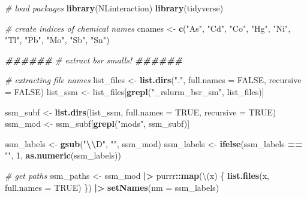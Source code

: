 \documentclass[12pt, twoside]{amherstthesis}
\newenvironment{Shaded}{\begin{snugshade}}{\end{snugshade}}
\newcommand{\AttributeTok}[1]{\textcolor[rgb]{0.13,0.29,0.53}{#1}}
\newcommand{\CommentTok}[1]{\textcolor[rgb]{0.56,0.35,0.01}{\textit{#1}}}
\newcommand{\ConstantTok}[1]{\textcolor[rgb]{0.56,0.35,0.01}{#1}}
\newcommand{\DecValTok}[1]{\textcolor[rgb]{0.00,0.00,0.81}{#1}}
\newcommand{\DocumentationTok}[1]{\textcolor[rgb]{0.56,0.35,0.01}{\textbf{\textit{#1}}}}
\newcommand{\FunctionTok}[1]{\textcolor[rgb]{0.13,0.29,0.53}{\textbf{#1}}}
\newcommand{\NormalTok}[1]{#1}
\newcommand{\OtherTok}[1]{\textcolor[rgb]{0.56,0.35,0.01}{#1}}
\newcommand{\SpecialCharTok}[1]{\textcolor[rgb]{0.81,0.36,0.00}{\textbf{#1}}}
\newcommand{\StringTok}[1]{\textcolor[rgb]{0.31,0.60,0.02}{#1}}
\begin{document}
\scriptsize
\begin{Shaded}
\begin{Highlighting}[]
\CommentTok{\# load packages}
\FunctionTok{library}\NormalTok{(NLinteraction)}
\FunctionTok{library}\NormalTok{(tidyverse)}

\CommentTok{\# create indices of chemical names}
\NormalTok{cnames }\OtherTok{\textless{}{-}} \FunctionTok{c}\NormalTok{(}\StringTok{"As"}\NormalTok{, }\StringTok{"Cd"}\NormalTok{, }\StringTok{"Co"}\NormalTok{, }\StringTok{"Hg"}\NormalTok{, }\StringTok{"Ni"}\NormalTok{, }\StringTok{"Tl"}\NormalTok{, }\StringTok{"Pb"}\NormalTok{, }\StringTok{"Mo"}\NormalTok{, }\StringTok{"Sb"}\NormalTok{, }\StringTok{"Sn"}\NormalTok{)}

\DocumentationTok{\#\#\#\#\#\#}
\CommentTok{\# extract bsr smalls!}
\DocumentationTok{\#\#\#\#\#\#}

\CommentTok{\# extracting file names}
\NormalTok{list\_files }\OtherTok{\textless{}{-}} \FunctionTok{list.dirs}\NormalTok{(}\StringTok{"."}\NormalTok{, }\AttributeTok{full.names =} \ConstantTok{FALSE}\NormalTok{, }\AttributeTok{recursive =} \ConstantTok{FALSE}\NormalTok{)}
\NormalTok{list\_ssm }\OtherTok{\textless{}{-}}\NormalTok{ list\_files[}\FunctionTok{grepl}\NormalTok{(}\StringTok{"\_rslurm\_bsr\_sm"}\NormalTok{, list\_files)]}

\NormalTok{ssm\_subf }\OtherTok{\textless{}{-}} \FunctionTok{list.dirs}\NormalTok{(list\_ssm, }\AttributeTok{full.names =} \ConstantTok{TRUE}\NormalTok{, }\AttributeTok{recursive =} \ConstantTok{TRUE}\NormalTok{)}
\NormalTok{ssm\_mod }\OtherTok{\textless{}{-}}\NormalTok{ ssm\_subf[}\FunctionTok{grepl}\NormalTok{(}\StringTok{"mods"}\NormalTok{, ssm\_subf)]}

\NormalTok{ssm\_labels }\OtherTok{\textless{}{-}} \FunctionTok{gsub}\NormalTok{(}\StringTok{"}\SpecialCharTok{\textbackslash{}\textbackslash{}}\StringTok{D"}\NormalTok{, }\StringTok{""}\NormalTok{, ssm\_mod)}
\NormalTok{ssm\_labels }\OtherTok{\textless{}{-}} \FunctionTok{ifelse}\NormalTok{(ssm\_labels }\SpecialCharTok{==} \StringTok{""}\NormalTok{, }\DecValTok{1}\NormalTok{, }\FunctionTok{as.numeric}\NormalTok{(ssm\_labels))}

\CommentTok{\# get paths}
\NormalTok{ssm\_paths }\OtherTok{\textless{}{-}}\NormalTok{ ssm\_mod }\SpecialCharTok{|\textgreater{}} 
\NormalTok{  purrr}\SpecialCharTok{::}\FunctionTok{map}\NormalTok{(\textbackslash{}(x) \{}
    \FunctionTok{list.files}\NormalTok{(x, }\AttributeTok{full.names =} \ConstantTok{TRUE}\NormalTok{)}
\NormalTok{  \}) }\SpecialCharTok{|\textgreater{}} 
  \FunctionTok{setNames}\NormalTok{(}\AttributeTok{nm =}\NormalTok{ ssm\_labels)}


\end{Highlighting}
\end{Shaded}
\end{document}
